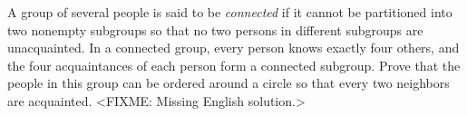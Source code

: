 \problem
A group of several people is said to be \emph{connected} if it cannot be
partitioned into two nonempty subgroups so that no two persons in different
subgroups are unacquainted.
In a connected group, every person knows exactly four others, and the four
acquaintances of each person form a connected subgroup.
Prove that the people in this group can be ordered around a circle so that
every two neighbors are acquainted.
\solution
<FIXME: Missing English solution.>
\endproblem
